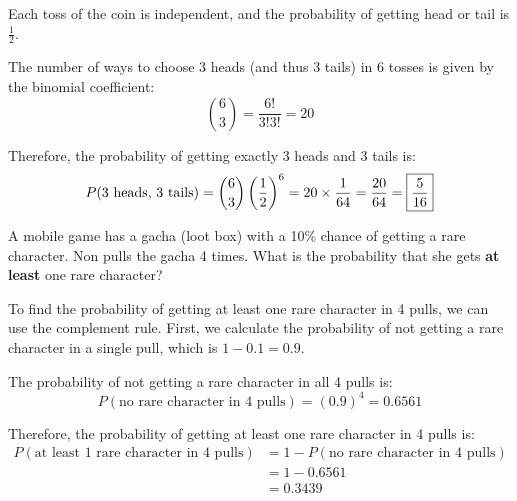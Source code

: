 \documentclass[a4paper, 10pt]{article}
\begin{document}
\begin{solution}
	Each toss of the coin is independent, and the probability of getting head or tail is \( \frac{1}{2} \).
	
	\myspace

	\par The number of ways to choose 3 heads (and thus 3 tails) in 6 tosses is given by the binomial coefficient:
	\[
		\binom{6}{3} = \frac{6!}{3!3!} = 20
	\]
	
	\myspace

	\par Therefore, the probability of getting exactly 3 heads and 3 tails is:
	\[
		P(\text{3 heads, 3 tails}) = \binom{6}{3} \left(\frac{1}{2}\right)^6 = 20 \times \frac{1}{64} = \frac{20}{64} = \boxed{\frac{5}{16}}
	\]
\end{solution}

\pagebreak

\begin{problem}
A mobile game has a gacha (loot box) with a 10\% chance of getting a rare character.
Non pulls the gacha 4 times. What is the probability that she gets \textbf{at least} one rare character?
\end{problem}

\begin{solution}
	To find the probability of getting at least one rare character in 4 pulls, we can use the complement rule.
	First, we calculate the probability of not getting a rare character in a single pull, which is \(1 - 0.1 = 0.9\).

	The probability of not getting a rare character in all 4 pulls is:
	\[
		P(\text{no rare character in 4 pulls}) = (0.9)^4 = 0.6561
	\]

	Therefore, the probability of getting at least one rare character in 4 pulls is:
	\begin{align*}
		P(\text{at least 1 rare character in 4 pulls}) & = 1 - P(\text{no rare character in 4 pulls}) \\
		                                               & = 1 - 0.6561                                 \\
		                                               & = \boxed{0.3439}
	\end{align*}
\end{solution}
\end{document}
